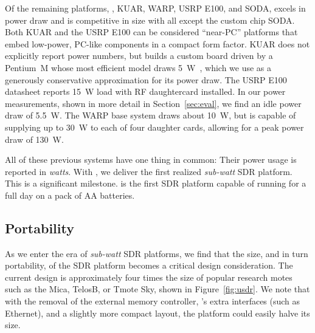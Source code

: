 Of the remaining platforms, \sdr, KUAR, WARP, USRP E100, and SODA,
\sdr excels in power draw and is competitive in size with all except
the custom chip SODA. Both KUAR and the USRP E100 can be considered
``near-PC'' platforms that embed low-power, PC-like components in a
compact form factor.  KUAR does not explicitly report power numbers,
but builds a custom board driven by a Pentium~M whose most efficient
model draws 5~W~\cite{pentium-m}, which we use as a generously
conservative approximation for its power draw.  The USRP E100
datasheet reports 15~W load with RF daughtercard installed. In our
power measurements, shown in more detail in
Section~\ref{sec:eval}, we find an idle power draw of
5.5~W. The WARP base system draws about 10~W, but is capable of
supplying up to 30~W to each of four daughter cards, allowing for a
peak power draw of 130~W.

All of these previous systems have one thing in common: Their power usage is
reported in {\em watts}.  With \sdr, we deliver the first realized {\em
sub-watt} SDR platform.  This is a significant milestone. \sdr is the first
SDR platform capable of running for a full day on a pack of AA
batteries.
\begin{comment}
~\footnote{Extrapolating from~\cite{mote-power}, we consider four AA
batteries with average of 2500~mAh and a fully charged nominal voltage of
1.6V~. The minimum supply voltage to \sdr is 4~V, yielding 9.75~Wh of
usable power. This is enough energy for \sdr to run 7.5 hours at full power
or 30.5 hours in maximum sleep.}
\end{comment}

\subsection{Portability}
\label{sec:related-portability}
As we enter the era of {\em sub-watt} SDR platforms, we find that the
size, and in turn portability, of the SDR platform becomes a critical
design consideration. The current \sdr design is approximately four
times the size of popular research motes such as the Mica, TelosB, or
Tmote Sky, shown in Figure~\ref{fig:usdr}. We note that with the
removal of the external memory controller, \sdr's extra interfaces
(such as Ethernet), and a slightly more compact layout, the \sdr
platform could easily halve its size.

